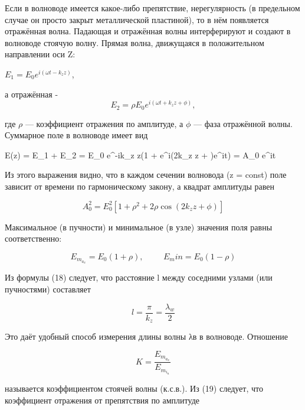 \documentclass[a4paper]{article}
\begin{document}
Если в волноводе имеется какое-либо препятствие, нерегулярность (в предельном случае он просто закрыт металлической пластиной), то в нём появляется отражённая волна. Падающая и отражённая волны интерферируют
и создают в волноводе стоячую волну. Прямая волна, движущаяся в положительном направлении оси Z:

\begin{center}
    $E_1 = E_0 e^{i(\omega t - k_z z)}$,
\end{center}
а отражённая - 
\begin{equation}
    E_2 = \rho E_0 e^{i(\omega t + k_z z + \phi)},
\end{equation}

где $\rho$ — коэффициент отражения по амплитуде, а $\phi$ — фаза отражённой волны. Суммарное поле в волноводе имеет вид

\begin{center}
    E(z) = E_1 + E_2 = E_0 e^{-ik_z z}(1 + \rho e^{i(2k_z z + \phi)}e^{i\omega t}) = A_0 e^{i\omega t}
\end{center}

Из этого выражения видно, что в каждом сечении волновода (z = const)
поле зависит от времени по гармоническому закону, а квадрат амплитуды
равен

\begin{equation}
    A_0^2 = E_0^2[1 + \rho^2 + 2\rho \cos(2k_z z + \phi)]
\end{equation}

Максимальное (в пучности) и минимальное (в узле) значения поля
равны соответственно:

\begin{equation}
    E_m_a_x = E_0 (1 + \rho), \hspace{1cm} E_min = E_0 (1 - \rho)
\end{equation}

Из формулы (18) следует, что расстояние l между соседними узлами (или
пучностями) составляет

\begin{equation}
    l = \frac{\pi}{k_z} = \frac{\lambda_w}{2}
\end{equation}

Это даёт удобный способ измерения длины волны λв в волноводе.
Отношение

\begin{equation}
    K = \frac{E_m_a_x}{E_m_i_n}
\end{equation}

называется коэффициентом стоячей волны (к.с.в.). Из (19) следует, что
коэффициент отражения от препятствия по амплитуде
\end{document}
